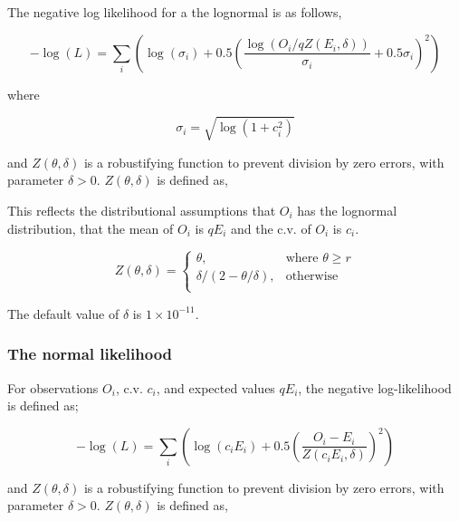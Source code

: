 The negative log likelihood for a the lognormal is as follows,

\begin{equation}
- \log \left(L \right) = \sum\limits_i \left( \log \left( \sigma _i \right) + 0.5\left( \frac{\log \left(O_i / q Z \left(E_i,\delta \right) \right)}{\sigma_i} + 0.5 \sigma_i \right)^2 \right)
\end{equation}

where 

\begin{equation}
\sigma_i  = \sqrt{\log \left(1+c_i^2 \right)}
\end{equation}

and $Z \left(\theta,\delta \right)$ is a robustifying function to prevent division by zero errors, with parameter $\delta>0$. $Z \left(\theta,\delta \right)$ is defined as,

This reflects the distributional assumptions that  $O_i$ has the lognormal distribution, that the mean of $O_i$ is $qE_i$  and the c.v. of $O_i$ is $c_i$.

\begin{equation}
Z \left(\theta,\delta \right) = \begin{cases}
\theta, & \text{where $\theta \ge r$} \\
\delta/\left( 2-\theta/\delta \right), & \text{otherwise} \\  
\end{cases}
\end{equation}

The default value of $\delta$ is $1 \times 10^{-11}$.

\subsubsection*{The normal likelihood}

For observations $O_i$, c.v. $c_i$, and expected values $qE_i$, the negative log-likelihood is defined as;

\begin{equation}
- \log \left(L \right) = \sum\limits_i \left( \log \left( c_i E_i \right) +0.5 \left( \frac{O_i-E_i}{Z\left(c_i E_i,\delta \right)}\right)^2\right)
\end{equation}

and $Z \left(\theta,\delta \right)$ is a robustifying function to prevent division by zero errors, with parameter $\delta>0$. $Z \left(\theta,\delta \right)$ is defined as,

